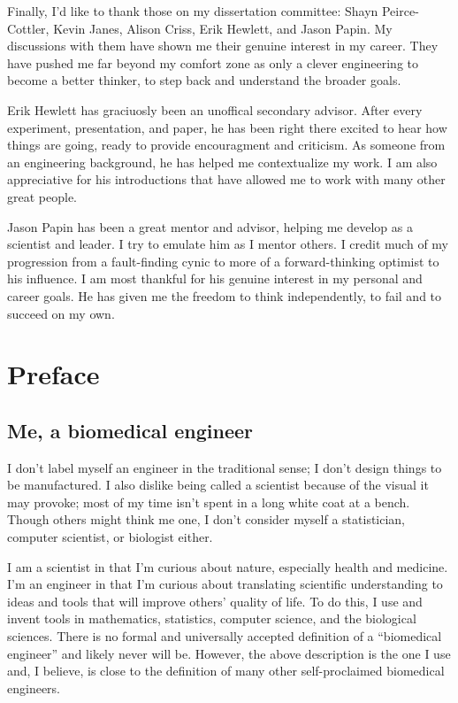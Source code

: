 Finally, I'd like to thank those on my dissertation committee:
Shayn Peirce-Cottler, Kevin Janes, Alison Criss, Erik Hewlett, and Jason Papin.
My discussions with them have shown me their genuine interest in my career.
They have pushed me far beyond my comfort zone as only
a clever engineering to become a better thinker, to step
back and understand the broader goals.

Erik Hewlett has graciuosly been an unoffical secondary advisor.
After every experiment, presentation, and paper, he has been right there
excited to hear how things are going, ready to provide encouragment and criticism.
As someone from an engineering background,
he has helped me contextualize my work.
I am also appreciative for 
his introductions that have allowed me to work with many other great people.

Jason Papin has been a great mentor and advisor, helping
me develop as a scientist and leader.
I try to emulate him as I mentor others.
I credit much of my progression from a fault-finding cynic to more of a  
forward-thinking optimist to his influence.
I am most thankful for his genuine interest in 
my personal and career goals. 
He has given me the freedom to think 
independently, to fail and to succeed on my own.


\chapter{Preface}

\section{Me, a biomedical engineer}

I don't label myself an engineer in the traditional sense; 
I don't design things to be manufactured. I also dislike 
being called a scientist because of the visual it may provoke; 
most of my time isn't spent in a long white coat at a 
bench. Though others might think me one, I don't consider 
myself a statistician, computer scientist, or biologist either.

I am a scientist in that I’m curious about nature, especially 
health and medicine. I’m an engineer in that I’m curious 
about translating scientific understanding to ideas and 
tools that will improve others' quality of life. To do 
this, I use and invent tools in mathematics, statistics, 
computer science, and the biological sciences. There is 
no formal and universally accepted definition of a 
``biomedical engineer'' and likely never will be. However, 
the above description is the one I use and, I believe, is
close to the definition of many other self-proclaimed 
biomedical engineers.

